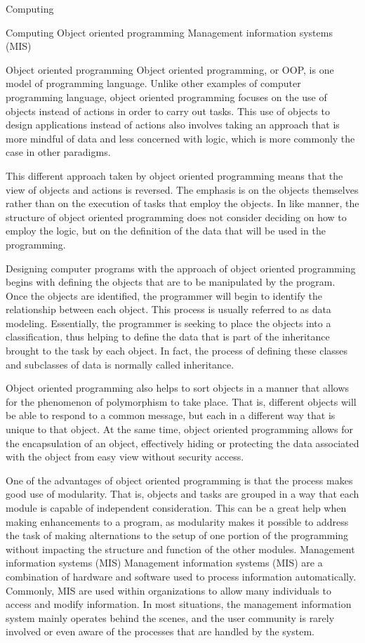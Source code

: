 Computing

Computing
Object oriented programming
Management information systems (MIS)

Object oriented programming
Object oriented programming, or OOP, is one model of programming language. Unlike other examples of computer programming language, object oriented programming focuses on the use of objects instead of actions in order to carry out tasks. This use of objects to design applications instead of actions also involves taking an approach that is more mindful of data and less concerned with logic, which is more commonly the case in other paradigms.

This different approach taken by object oriented programming means that the view of objects and actions is reversed. The emphasis is on the objects themselves rather than on the execution of tasks that employ the objects. In like manner, the structure of object oriented programming does not consider deciding on how to employ the logic, but on the definition of the data that will be used in the programming.

Designing computer programs with the approach of object oriented programming begins with defining the objects that are to be manipulated by the program. Once the objects are identified, the programmer will begin to identify the relationship between each object. This process is usually referred to as data modeling. Essentially, the programmer is seeking to place the objects into a classification, thus helping to define the data that is part of the inheritance brought to the task by each object. In fact, the process of defining these classes and subclasses of data is normally called inheritance.

Object oriented programming also helps to sort objects in a manner that allows for the phenomenon of polymorphism to take place. That is, different objects will be able to respond to a common message, but each in a different way that is unique to that object. At the same time, object oriented programming allows for the encapsulation of an object, effectively hiding or protecting the data associated with the object from easy view without security access.

One of the advantages of object oriented programming is that the process makes good use of modularity. That is, objects and tasks are grouped in a way that each module is capable of independent consideration. This can be a great help when making enhancements to a program, as modularity makes it possible to address the task of making alternations to the setup of one portion of the programming without impacting the structure and function of the other modules.
Management information systems (MIS) 
Management information systems (MIS) are a combination of hardware and software used to process information automatically. Commonly, MIS are used within organizations to allow many individuals to access and modify information. In most situations, the management information system mainly operates behind the scenes, and the user community is rarely involved or even aware of the processes that are handled by the system.

